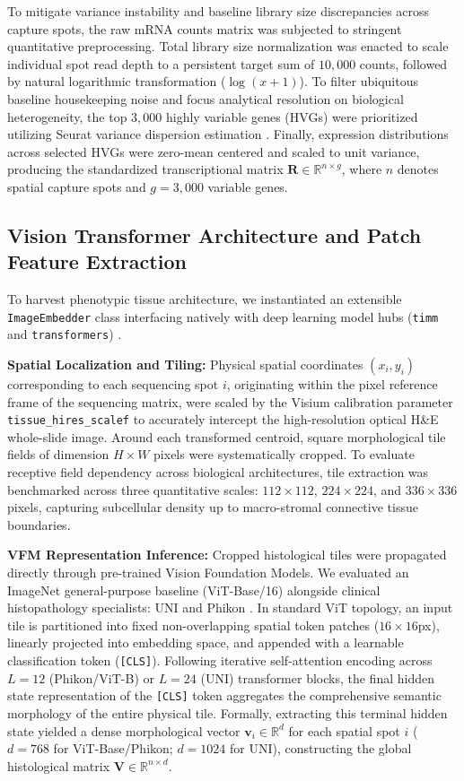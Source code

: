 \documentclass[11pt, a4paper]{article}
\begin{document}
To mitigate variance instability and baseline library size discrepancies across capture spots, the raw mRNA counts matrix was subjected to stringent quantitative preprocessing. Total library size normalization was enacted to scale individual spot read depth to a persistent target sum of $10,000$ counts, followed by natural logarithmic transformation ($\log(x+1)$). To filter ubiquitous baseline housekeeping noise and focus analytical resolution on biological heterogeneity, the top $3,000$ highly variable genes (HVGs) were prioritized utilizing Seurat variance dispersion estimation \cite{stuart2019comprehensive}. Finally, expression distributions across selected HVGs were zero-mean centered and scaled to unit variance, producing the standardized transcriptional matrix $\mathbf{R} \in \mathbb{R}^{n \times g}$, where $n$ denotes spatial capture spots and $g=3,000$ variable genes.

\subsection{Vision Transformer Architecture and Patch Feature Extraction}
To harvest phenotypic tissue architecture, we instantiated an extensible \texttt{ImageEmbedder} class interfacing natively with deep learning model hubs (\texttt{timm} and \texttt{transformers}) \cite{wightman2019pytorch}.

\textbf{Spatial Localization and Tiling:} Physical spatial coordinates $(x_i, y_i)$ corresponding to each sequencing spot $i$, originating within the pixel reference frame of the sequencing matrix, were scaled by the Visium calibration parameter \texttt{tissue\_hires\_scalef} to accurately intercept the high-resolution optical H\&E whole-slide image. Around each transformed centroid, square morphological tile fields of dimension $H \times W$ pixels were systematically cropped. To evaluate receptive field dependency across biological architectures, tile extraction was benchmarked across three quantitative scales: $112\times112$, $224\times224$, and $336\times336$ pixels, capturing subcellular density up to macro-stromal connective tissue boundaries.

\textbf{VFM Representation Inference:} Cropped histological tiles were propagated directly through pre-trained Vision Foundation Models. We evaluated an ImageNet general-purpose baseline (ViT-Base/16) \cite{dosovitskiy2021image} alongside clinical histopathology specialists: UNI \cite{chen2024general} and Phikon \cite{filiot2024scaling}. In standard ViT topology, an input tile is partitioned into fixed non-overlapping spatial token patches ($16\times16$px), linearly projected into embedding space, and appended with a learnable classification token (\texttt{[CLS]}). Following iterative self-attention encoding across $L=12$ (Phikon/ViT-B) or $L=24$ (UNI) transformer blocks, the final hidden state representation of the \texttt{[CLS]} token aggregates the comprehensive semantic morphology of the entire physical tile. Formally, extracting this terminal hidden state yielded a dense morphological vector $\mathbf{v}_i \in \mathbb{R}^d$ for each spatial spot $i$ ($d = 768$ for ViT-Base/Phikon; $d = 1024$ for UNI), constructing the global histological matrix $\mathbf{V} \in \mathbb{R}^{n \times d}$.
\end{document}
